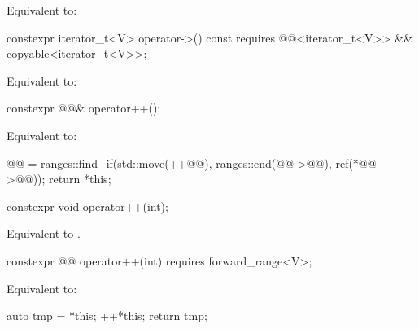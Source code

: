 \begin{itemdescr}
\pnum
\effects
Equivalent to: 
\end{itemdescr}

%
\begin{itemdecl}
constexpr iterator_t<V> operator->() const
  requires @@<iterator_t<V>> && copyable<iterator_t<V>>;
\end{itemdecl}

\begin{itemdescr}
\pnum
\effects
Equivalent to: 
\end{itemdescr}

%
\begin{itemdecl}
constexpr @@& operator++();
\end{itemdecl}

\begin{itemdescr}
\pnum
\effects
Equivalent to:
\begin{codeblock}
@@ = ranges::find_if(std::move(++@@), ranges::end(@@->@@),
                           ref(*@@->@@));
return *this;
\end{codeblock}
\end{itemdescr}

%
\begin{itemdecl}
constexpr void operator++(int);
\end{itemdecl}

\begin{itemdescr}
\pnum
\effects
Equivalent to .
\end{itemdescr}

%
\begin{itemdecl}
constexpr @@ operator++(int) requires forward_range<V>;
\end{itemdecl}

\begin{itemdescr}
\pnum
\effects
Equivalent to:
\begin{codeblock}
auto tmp = *this;
++*this;
return tmp;
\end{codeblock}
\end{itemdescr}

